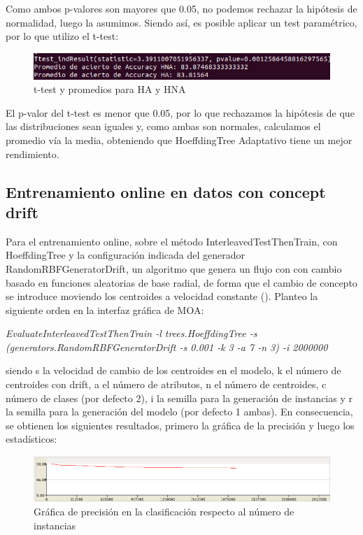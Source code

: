 Como ambos p-valores son mayores que 0.05, no podemos rechazar la hipótesis de normalidad, luego la asumimos. Siendo así, es posible aplicar un test paramétrico, por lo que utilizo el t-test:

\begin{figure}[H] %
	\centering
	\includegraphics[scale=0.4]{onl4.png}  %
	\caption{t-test y promedios para HA y HNA} 
	\label{fig:onl4}
\end{figure}

El p-valor del t-test es menor que 0.05, por lo que rechazamos la hipótesis de que las distribuciones sean iguales y, como ambas son normales, calculamos el promedio vía la media, obteniendo que HoeffdingTree Adaptativo tiene un mejor rendimiento.

\subsection{Entrenamiento online en datos con concept drift}

Para el entrenamiento online, sobre el método InterleavedTestThenTrain, con HoeffdingTree y la configuración indicada del generador RandomRBFGeneratorDrift, un algoritmo que genera un flujo con con cambio basado en funciones aleatorias de base radial, de forma que el cambio de concepto se introduce moviendo los centroides a velocidad constante (\cite{moa-manual}). Planteo la siguiente orden en la interfaz gráfica de MOA:

\textit{EvaluateInterleavedTestThenTrain -l trees.HoeffdingTree -s (generators.RandomRBFGeneratorDrift -s 0.001 -k 3 -a 7 -n 3) -i 2000000}

siendo s la velocidad de cambio de los centroides en el modelo, k el número de centroides con drift, a el número de atributos, n el número de centroides, c número de clases (por defecto 2), i la semilla para la generación de instancias y r la semilla para la generación del modelo (por defecto 1 ambas). En consecuencia, se obtienen los siguientes resultados, primero la gráfica de la precisión y luego los estadísticos:

\begin{figure}[H] %
	\centering
	\includegraphics[scale=0.4]{cd1.png}  %
	\caption{Gráfica de precisión en la clasificación respecto al número de instancias} 
	\label{fig:cd1}
\end{figure}

